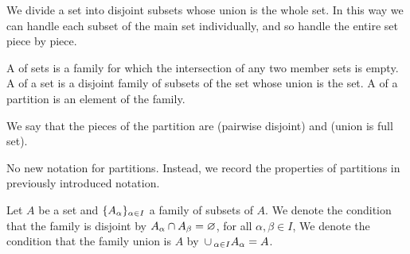 
\sbasic










\sstart
{}


We divide a set into
disjoint subsets whose
union is the whole set.
In this way we can handle
each subset of the main set
individually, and so handle
the entire set piece by piece.


A 
of sets is a family for which
the intersection of any two
member sets is empty.
A  of
a set is a disjoint family of
subsets of the set
whose union is the set.
A
of a partition is an
element of the family.

We say that the pieces
of the partition
are
 (pairwise disjoint)
and
 (union is full set).


No new notation for partitions.
Instead,
we record the properties
of partitions in previously
introduced notation.

Let $A$ be a set and
$\{A_{\alpha}\}_{\alpha \in I}$
a family of subsets of $A$.
We denote the condition that
the family is disjoint by
$A_{\alpha} \cap A_{\beta} = \varnothing$,
for all $\alpha,\beta \in I$,
We denote the condition that the family
union is $A$ by
$\,\cup\,_{\alpha \in I} A_{\alpha} = A$.

\strats
\strats
